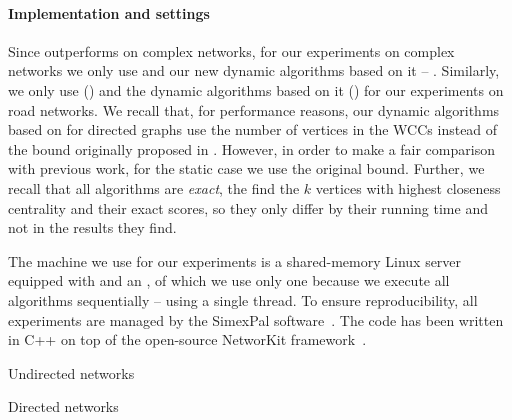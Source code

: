 \paragraph{Implementation and settings}
%
Since \nbcut outperforms \nbbound on complex networks, for our experiments on
complex networks we only use \nbcut and our new dynamic algorithms based on it
-- \ie {}.
Similarly, we only use \nbbound ()
and the dynamic algorithms based on it () for our
experiments on road networks.
%
We recall that, for performance reasons, our dynamic algorithms based on \nbcut
for directed graphs use the number of vertices in the WCCs instead of the bound
originally proposed in \cite{DBLP:journals/tkdd/BergaminiBCMM19}. However,
in order to make a fair comparison with previous work, for the static case we
use the original bound.
Further, we recall that all algorithms are \emph{exact}, \ie the find the $k$
vertices with highest closeness centrality and their exact scores, so they only
differ by their running time and not in the results they find.

The machine we use for our experiments is a shared-memory Linux server equipped
with \RAM and an \CPU, of which we use only one because we execute all
algorithms sequentially -- \ie using a single thread.
To ensure reproducibility, all experiments are managed by the SimexPal
software~\cite{DBLP:journals/algorithms/AngrimanGLMNPT19}.
The code has been written in C++ on top of the open-source
NetworKit framework~\cite{DBLP:journals/netsci/StaudtSM16}.


\begin{table}
\footnotesize
\centering
{}
\label{tab:dyn-topk-affected}

\begin{subtable}[t]{\textwidth}
\centering
\caption{Undirected networks}
\label{tab:dyn-topk-affected-undirected}

\end{subtable}\bigskip

\begin{subtable}[t]{\textwidth}
\centering
\caption{Directed networks}
\label{tab:dyn-topk-affected-directed}


\end{subtable}
\end{table}

